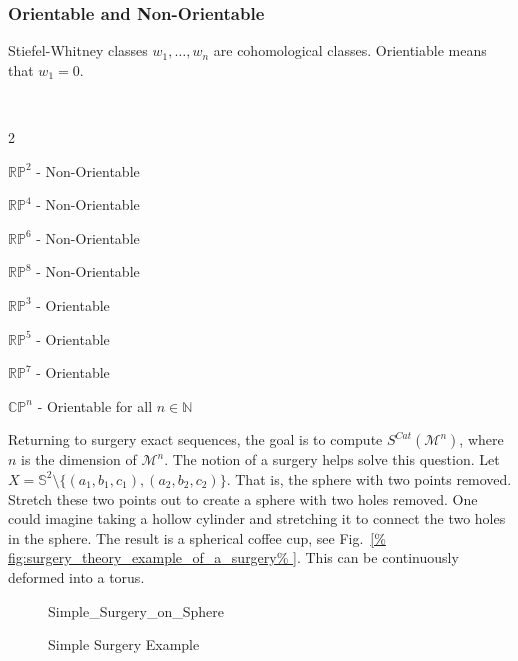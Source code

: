 \documentclass[crop=false,class=article,oneside]{standalone}
\begin{document}
        \subsubsection{Orientable and Non-Orientable}
            Stiefel-Whitney classes $w_{1},\hdots, w_{n}$ are
            cohomological classes.
            Orientiable means that $w_{1}=0$.
            \begin{example}
                \
                \begin{enumerate}
                \end{enumerate}
            \end{example}
            Returning to surgery exact sequences, the goal
            is to compute $S^{Cat}(\mathcal{M}^{n})$, where $n$
            is the dimension of $\mathcal{M}^{n}$. The notion
            of a surgery helps solve this question. Let
            $X=\mathbb{S}^{2}\setminus%
             \{(a_{1},b_{1},c_{1}),(a_{2},b_{2},c_{2})\}$.
            That is, the sphere with two points removed.
            Stretch these two points out to create a sphere
            with two holes removed. One could imagine taking
            a hollow cylinder and stretching it to connect
            the two holes in the sphere. The result is a
            spherical coffee cup, see
            Fig.~\ref{%
                fig:surgery_theory_example_of_a_surgery%
            }.
            This can be continuously deformed into a torus.
            \begin{figure}[H]
                \centering
                \captionsetup{type=figure}
                
                          {Simple_Surgery_on_Sphere}
                \caption{Simple Surgery Example}
                \label{fig:surgery_theory_example_of_a_surgery}
            \end{figure}
\end{document}
